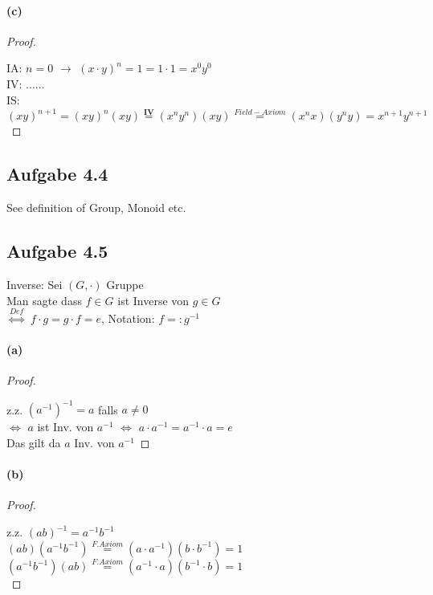 \paragraph{(c)}
\begin{proof}
$ $\newline

IA: $n=0$ $\rightarrow$ $(x\cdot y)^n=1=1\cdot 1=x^0y^0$\\

IV: ......\\

IS: $(xy)^{n+1}=(xy)^n(xy)\overset{\mathbf{IV}}{=}(x^ny^n)(xy)\overset{Field-Axiom}{=}(x^nx)(y^ny)=x^{n+1}y^{n+1}$
\end{proof}


\newpage

\subsection{Aufgabe 4.4}
See definition of Group, Monoid etc.

\newpage

\subsection{Aufgabe 4.5}

Inverse: Sei $(G,\cdot)$ Gruppe\\
Man sagte dass $f\in G$ ist Inverse von $g\in G$\\
$\overset{Def}{\Leftrightarrow}$ $f\cdot g=g\cdot f=e$, Notation: $f=:g^{-1}$

\paragraph{(a)}
\begin{proof}
$ $\newline

z.z. $(a^{-1})^{-1}=a$ falls $a\neq 0$\\

$\Leftrightarrow$ $a$ ist Inv. von $a^{-1}$ $\Leftrightarrow$ $a\cdot a^{-1}=a^{-1}\cdot a=e$\\

Das gilt da $a$ Inv. von $a^{-1}$
\end{proof}

\paragraph{(b)}
\begin{proof}
$ $\newline

z.z. $(ab)^{-1}=a^{-1}b^{-1}$\\

$(ab)(a^{-1}b^{-1})\overset{F.Axiom}{=}(a\cdot a^{-1})(b\cdot b^{-1})=1$\\

$(a^{-1}b^{-1})(ab)\overset{F.Axiom}{=}(a^{-1}\cdot a)(b^{-1}\cdot b)=1$\\
\end{proof}

